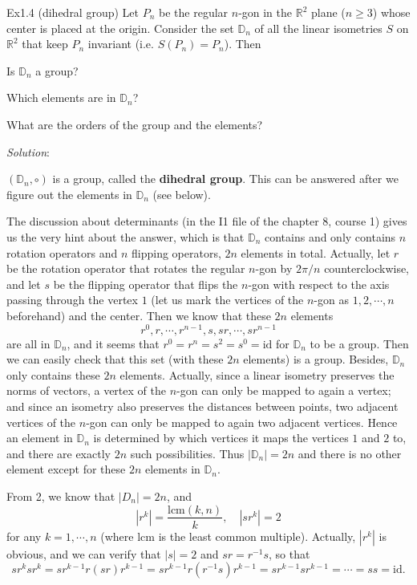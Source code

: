 \documentclass{article}
\newcommand{\lcm}{\text{lcm}}
\begin{document}
\begin{Th}{Ex1.4 (dihedral group)}
    Let $P_n$ be the regular $n$-gon in the $\mathbb{R}^2$ plane ($n\geq 3$) whose center is placed at the origin. Consider the set $\mathbb{D}_n$ of all the linear isometries $S$ on $\mathbb{R}^2$ that keep $P_n$ invariant (i.e. $S(P_n)=P_n$). Then
    \begin{compactenum}
        \item Is $\mathbb{D}_n$ a group?
        \item Which elements are in $\mathbb{D}_n$? 
        \item What are the orders of the group and the elements?
    \end{compactenum}
    \tcblower
    \textit{Solution}:
    \begin{compactenum}
        \item $(\mathbb{D}_n, \circ)$ is a group, \textcolor{Df}{called the \textbf{dihedral group}}. This can be answered after we figure out the elements in $\mathbb{D}_n$ (see below).
        \item The discussion about determinants (in the I1 file of the chapter 8, course 1) gives us the very hint about the answer, which is that $\mathbb{D}_n$ contains and only contains $n$ rotation operators and $n$ flipping operators, $2n$ elements in total. Actually, let $r$ be the rotation operator that rotates the regular $n$-gon by $2\pi/n$ counterclockwise, and let $s$ be the flipping operator that flips the $n$-gon with respect to the axis passing through the vertex $1$ (let us mark the vertices of the $n$-gon as $1, 2, \cdots, n$ beforehand) and the center. Then we know that these $2n$ elements 
        $$ r^0, r, \cdots, r^{n-1}, s, sr, \cdots, sr^{n-1} $$
        are all in $\mathbb{D}_n$, and it seems that $r^0 = r^n = s^2 = s^0 = \mathrm{id}$ for $\mathbb{D}_n$ to be a group. Then we can easily check that this set (with these $2n$ elements) is a group. Besides, $\mathbb{D}_n$ only contains these $2n$ elements. Actually, since a linear isometry preserves the norms of vectors, a vertex of the $n$-gon can only be mapped to again a vertex; and since an isometry also preserves the distances between points, two adjacent vertices of the $n$-gon can only be mapped to again two adjacent vertices. Hence an element in $\mathbb{D}_n$ is determined by which vertices it maps the vertices $1$ and $2$ to, and there are exactly $2n$ such possibilities. Thus $|\mathbb{D}_n|=2n$ and there is no other element except for these $2n$ elements in $\mathbb{D}_n$.
        \item From 2, we know that $|D_n|=2n$, and
        $$ |r^k| = \frac{\lcm(k, n)}{k}, \quad |sr^k| = 2 $$
        for any $k=1,\cdots, n$ (where $\lcm$ is the least common multiple).
        Actually, $|r^k|$ is obvious, and we can verify that $|s| = 2$ and $sr = r^{-1}s$, so that 
        $$ sr^k sr^k = sr^{k-1}r(sr)r^{k-1} = sr^{k-1}r(r^{-1}s)r^{k-1} = sr^{k-1}sr^{k-1} = \cdots = ss = \mathrm{id}. $$
    \end{compactenum}
\end{Th}
\end{document}
